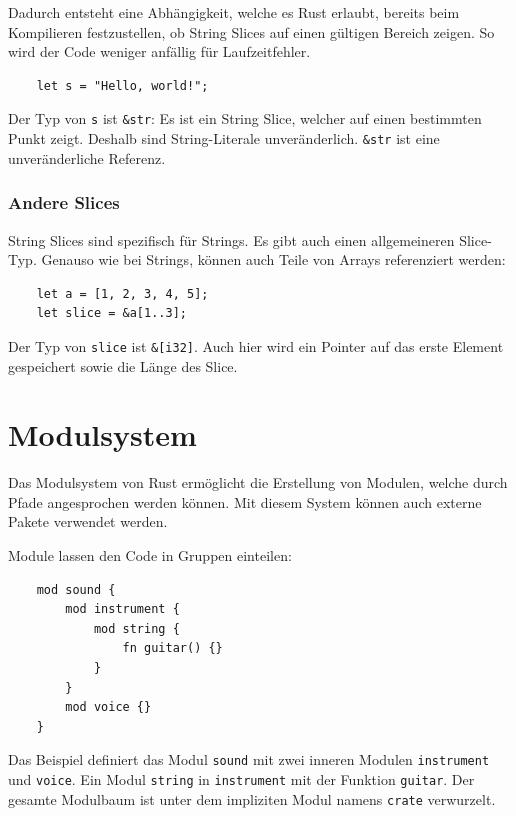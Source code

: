 Dadurch entsteht eine Abhängigkeit, welche es Rust erlaubt, bereits beim Kompilieren festzustellen, ob String Slices auf einen gültigen Bereich zeigen. So wird der Code weniger anfällig für Laufzeitfehler.

\begin{lstlisting}
    let s = "Hello, world!";
\end{lstlisting}

Der Typ von \verb"s" ist \verb"&str": Es ist ein String Slice, welcher auf einen bestimmten Punkt zeigt. Deshalb sind String-Literale unveränderlich. \verb"&str" ist eine unveränderliche Referenz.

\subsubsection{Andere Slices}

String Slices sind spezifisch für Strings. Es gibt auch einen allgemeineren Slice-Typ. Genauso wie bei Strings, können auch Teile von Arrays referenziert werden:

\begin{lstlisting}
    let a = [1, 2, 3, 4, 5];
    let slice = &a[1..3];
\end{lstlisting}

Der Typ von \verb"slice" ist \verb"&[i32]". Auch hier wird ein Pointer auf das erste Element gespeichert sowie die Länge des Slice.


\section{Modulsystem}

Das Modulsystem von Rust ermöglicht die Erstellung von Modulen, welche durch Pfade angesprochen werden können. Mit diesem System können auch externe Pakete verwendet werden.

Module lassen den Code in Gruppen einteilen:

\begin{lstlisting}
    mod sound {
        mod instrument {
            mod string {
                fn guitar() {}
            }
        }
        mod voice {}
    }
\end{lstlisting}

Das Beispiel definiert das Modul \verb"sound" mit zwei inneren Modulen \verb"instrument" und \verb"voice". Ein Modul \verb"string" in \verb"instrument" mit der Funktion \verb"guitar". Der gesamte Modulbaum ist unter dem impliziten Modul namens \verb"crate" verwurzelt.

